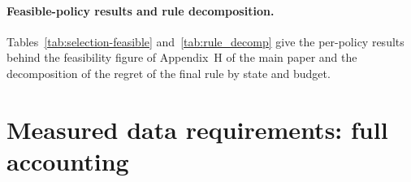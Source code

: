 \paragraph{Feasible-policy results and rule decomposition.} Tables~\ref{tab:selection-feasible} and~\ref{tab:rule_decomp} give the per-policy results behind the feasibility figure of Appendix~H of the main paper and the decomposition of the regret of the final rule by state and budget.


\section{Measured data requirements: full accounting}
\label{sec:supp_dreq_full}


